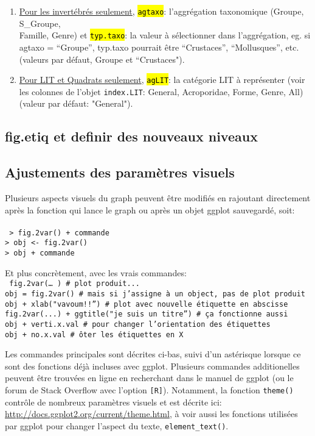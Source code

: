 \documentclass[12pt]{article}
\begin{document}
\begin{enumerate}
\item \underline{Pour les invertébrés seulement}, \hl{\texttt{agtaxo}}: l’aggrégation taxonomique (Groupe, S\_Groupe,\\ Famille, Genre) et \hl{\texttt{typ.taxo}}: la valeur à sélectionner dans l’aggrégation, eg. si agtaxo = ``Groupe”, typ.taxo pourrait être ``Crustaces”, ``Mollusques”, etc. (valeurs par défaut, Groupe et ``Crustaces").

\item \underline{Pour LIT et Quadrats seulement}, \hl{\texttt{agLIT}}: la catégorie LIT à représenter (voir les colonnes de l'objet \texttt{index.LIT}: General, Acroporidae, Forme, Genre, All) (valeur par défaut: "General"). 

\end{enumerate}
\subsection{fig.etiq et definir des nouveaux niveaux}

\subsection{Ajustements des paramètres visuels}
Plusieurs aspects visuels du graph peuvent être modifiés en rajoutant  directement après la fonction qui lance le graph ou après un objet ggplot sauvegardé, soit: \\
\\
\texttt{
> fig.2var() + commande\\
> obj <- fig.2var()\\
> obj + commande\\
}

Et plus concrètement, avec les vrais commandes:\\

\texttt{
fig.2var(… )  \# plot produit...\\
obj = fig.2var() \# mais si j’assigne à un object, pas de plot produit\\
obj + xlab("vavoum!!”) \# plot  avec nouvelle étiquette en abscisse\\
fig.2var(...) + ggtitle("je suis un titre”) \# ça fonctionne aussi\\
obj + verti.x.val \# pour changer l’orientation des étiquettes\\
obj + no.x.val \# ôter les étiquettes en X}

Les commandes principales sont décrites ci-bas, suivi d'un astérisque lorsque ce sont des fonctions déjà incluses avec ggplot.
Plusieurs commandes additionelles peuvent être trouvées en ligne en recherchant dans le manuel de ggplot (ou le forum de Stack Overflow avec l'option \texttt{[R]}). Notamment, la fonction \texttt{theme()} contrôle de nombreux paramètres visuels et est décrite ici: \url{http://docs.ggplot2.org/current/theme.html}, à voir aussi les fonctions utilisées par ggplot pour changer l'aspect du texte, \texttt{element\_text()}.
\end{document}
